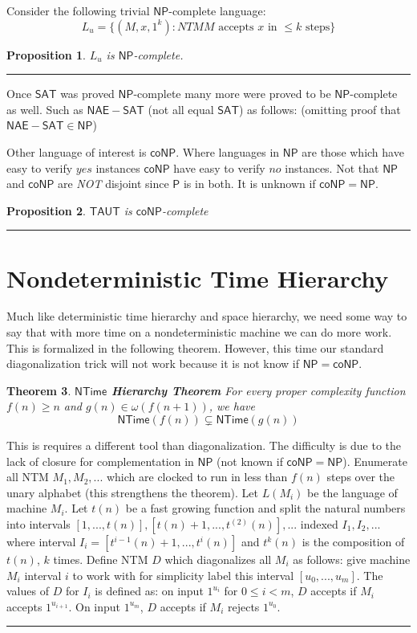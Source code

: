 \documentclass[twoside]{article}
\newcounter{lecnum}
\newtheorem{theorem}{Theorem}[lecnum]
\newtheorem{proposition}[theorem]{Proposition}
\newenvironment{proof}{{\bf Proof:}}{\hfill\rule{2mm}{2mm}}
\def\P{\mathsf{P}}
\def\NP{\mathsf{NP}}
\def\coNP{\mathsf{coNP}}
\def\SAT{\mathsf{SAT}}
\def\TAUT{\mathsf{TAUT}}
\def\NTime{\mathsf{NTime}}
\begin{document}
Consider the following trivial $\NP$-complete language:
\[L_u = \{ (M, x, 1^k): NTM M \mbox{ accepts } x \mbox{ in } \leq k \mbox{ steps}\}\]
\begin{proposition}
$L_u$ is $\NP$-complete.
\end{proposition}
\begin{proof}

\end{proof}

Once $\SAT$ was proved $\NP$-complete many more were proved to be $\NP$-complete as well. Such as $\mathsf{NAE-SAT}$ (not all equal $\SAT$) as follows: (omitting proof that $\mathsf{NAE-SAT} \in \NP$) 

Other language of interest is $\coNP$. Where languages in $\NP$ are those which have easy to verify $yes$ instances $\coNP$ have easy to verify $no$ instances. Not that $\NP$ and $\coNP$ are \emph{NOT} disjoint since $\P$ is in both. It is unknown if $\coNP = \NP$. 

\begin{proposition}
$\TAUT$ is $\coNP$-complete
\end{proposition}
\begin{proof}

\end{proof} 

\section{Nondeterministic Time Hierarchy}
Much like deterministic time hierarchy and space hierarchy, we need some way to say that with more time on a nondeterministic machine we can do more work. This is formalized in the following theorem. However, this time our standard diagonalization trick will not work because it is not know if $\NP = \coNP$.

\begin{theorem}
\textbf{$\NTime$ Hierarchy Theorem} For every proper complexity function $f(n) \geq n$ and $g(n) \in \omega(f(n+1))$, we have
\[\NTime (f(n)) \subsetneq \NTime (g(n))\]
\end{theorem} 
\begin{proof}
This is requires a different tool than diagonalization. The difficulty is due to the lack of closure for complementation in $\NP$ (not known if $\coNP = \NP$). Enumerate all NTM $M_1, M_2, ...$ which are clocked to run in less than $f(n)$ steps over the unary alphabet (this strengthens the theorem). Let $L(M_i)$ be the language of machine $M_i$. Let $t(n)$ be a fast growing function and split the natural numbers into intervals $[1, ..., t(n)], [t(n) + 1, ..., t^{(2)}(n)], ...$ indexed $I_1, I_2, ...$ where interval $I_i = [t^{i-1}(n) + 1, ..., t^{i}(n)]$ and $t^{k}(n)$ is the composition of $t(n)$, $k$ times. Define NTM $D$ which diagonalizes all $M_i$ as follows: give machine $M_i$ interval $i$ to work with for simplicity label this interval $[u_0, ..., u_m]$. The values of $D$ for $I_i$ is defined as: on input $1^{u_i}$ for $0 \leq i < m$, $D$ accepts if $M_i$ accepts $1^{u_{i+1}}$. On input $1^{u_m}$, $D$ accepts if $M_i$ rejects $1^{u_0}$.     
\end{proof}
\end{document}
